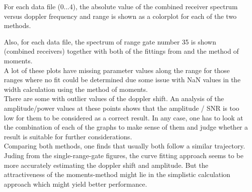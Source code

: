 For each data file (0...4), the absolute value of the combined receiver spectrum versus doppler frequency and range is shown as a colorplot for each of the two methods.

Also, for each data file, the spectrum of range gate number 35 is shown (combined receivers) together with both of the fittings from  and the method of moments.\\

A lot of these plots have missing parameter values along the range for those ranges where no fit could be determined due some issue with NaN values in the width calculation using the method of moments. \\

There are some with outlier values of the doppler shift. An analysis of the amplitude/power values at these points shows that the amplitude / SNR is too low for them to be considered as a correct result. In any case, one has to look at the combination of each of the graphs to make sense of them and judge whether a result is suitable for further considerations.\\

Comparing both methods, one finds that usually both follow a similar trajectory. Juding from the single-range-gate figures, the curve fitting approach seems to be more accurately estimating the doppler shift and amplitude. But the attractiveness of the moments-method might lie in the simplistic calculation approach which might yield better performance.


